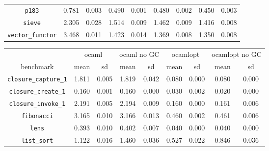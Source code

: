 \documentclass[12pt,a4paper,twoside,openright]{report}
\begin{document}
\begin{table}[h]
\begin{tabular}{| c | c c | c c | c c | c c |}
\lstinline!p183!              & \cellcolor[hsb]{0.0,0.377,1}0.781 & 0.003 & \cellcolor[hsb]{0.0,0.051,1}0.490 & 0.001 & \cellcolor[hsb]{0.0,0.040,1}0.480 & 0.002 & \cellcolor[hsb]{0.0,0.006,1}0.450 & 0.003 \\
\lstinline!sieve!             & \cellcolor[hsb]{0.3,0.166,1}2.305 & 0.028 & \cellcolor[hsb]{0.3,0.452,1}1.514 & 0.009 & \cellcolor[hsb]{0.3,0.471,1}1.462 & 0.009 & \cellcolor[hsb]{0.3,0.487,1}1.416 & 0.008 \\
\lstinline!vector_functor!    & \cellcolor[hsb]{0.3,0.422,1}3.468 & 0.011 & \cellcolor[hsb]{0.3,0.763,1}1.423 & 0.014 & \cellcolor[hsb]{0.3,0.772,1}1.369 & 0.008 & \cellcolor[hsb]{0.3,0.775,1}1.350 & 0.008 \\
\hline
\end{tabular}

\begin{tabular}{| c | c c | c c | c c | c c |}
  \hline
  & \multicolumn{2}{c|}{ocaml}
  & \multicolumn{2}{c|}{ocaml no GC}
  & \multicolumn{2}{c|}{ocamlopt}
  & \multicolumn{2}{c|}{ocamlopt no GC}
  \\
benchmark                     & mean  & sd    & mean  & sd    & mean  & sd    & mean  & sd \\
  \hline
\lstinline!closure_capture_1! & \cellcolor[hsb]{0.3,0.000,1}1.811 & 0.005 & \cellcolor[hsb]{0.0,0.002,1}1.819 & 0.042 & \cellcolor[hsb]{0.3,0.956,1}0.080 & 0.000 & \cellcolor[hsb]{0.3,0.956,1}0.080 & 0.000 \\
\lstinline!closure_create_1!  & \cellcolor[hsb]{0.3,0.000,1}0.160 & 0.001 & \cellcolor[hsb]{0.3,0.001,1}0.160 & 0.000 & \cellcolor[hsb]{0.3,0.810,1}0.030 & 0.002 & \cellcolor[hsb]{0.3,0.875,1}0.020 & 0.000 \\
\lstinline!closure_invoke_1!  & \cellcolor[hsb]{0.3,0.000,1}2.191 & 0.005 & \cellcolor[hsb]{0.0,0.000,1}2.194 & 0.009 & \cellcolor[hsb]{0.3,0.927,1}0.160 & 0.000 & \cellcolor[hsb]{0.3,0.927,1}0.161 & 0.006 \\
\lstinline!fibonacci!         & \cellcolor[hsb]{0.3,0.000,1}3.165 & 0.010 & \cellcolor[hsb]{0.3,0.000,1}3.166 & 0.013 & \cellcolor[hsb]{0.3,0.855,1}0.460 & 0.002 & \cellcolor[hsb]{0.3,0.854,1}0.461 & 0.006 \\
\lstinline!lens!              & \cellcolor[hsb]{0.3,0.000,1}0.393 & 0.010 & \cellcolor[hsb]{0.0,0.012,1}0.402 & 0.007 & \cellcolor[hsb]{0.3,0.898,1}0.040 & 0.000 & \cellcolor[hsb]{0.3,0.898,1}0.040 & 0.000 \\
\lstinline!list_sort!         & \cellcolor[hsb]{0.3,0.000,1}1.122 & 0.016 & \cellcolor[hsb]{0.0,0.151,1}1.460 & 0.036 & \cellcolor[hsb]{0.3,0.530,1}0.527 & 0.022 & \cellcolor[hsb]{0.3,0.246,1}0.846 & 0.036 \\

\end{tabular}
\end{table}
\end{document}
